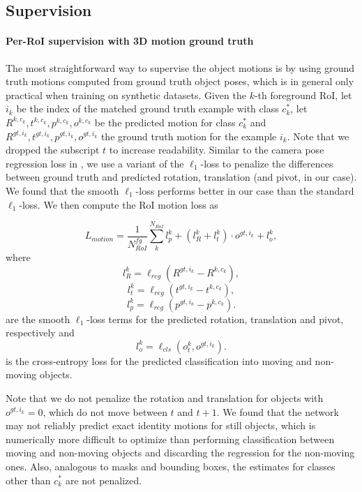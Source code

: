 \subsection{Supervision}
\label{ssec:supervision}

\paragraph{Per-RoI supervision with 3D motion ground truth}
The most straightforward way to supervise the object motions is by using ground truth
motions computed from ground truth object poses, which is in general
only practical when training on synthetic datasets.
Given the $k$-th foreground RoI, let $i_k$ be the index of the matched ground truth example with class $c_k^*$,
let $R^{k,c_k}, t^{k,c_k}, p^{k,c_k}, o^{k,c_k}$ be the predicted motion for class $c_k^*$
and $R^{gt,i_k}, t^{gt,i_k}, p^{gt,i_k}, o^{gt,i_k}$ the ground truth motion for the example $i_k$.
Note that we dropped the subscript $t$ to increase readability.
Similar to the camera pose regression loss in \cite{PoseNet2},
we use a variant of the $\ell_1$-loss to penalize the differences between ground truth and predicted
rotation, translation (and pivot, in our case). We found that the smooth $\ell_1$-loss
performs better in our case than the standard $\ell_1$-loss.
We then compute the RoI motion loss as

\begin{equation}
L_{motion} = \frac{1}{N_{RoI}^{fg}} \sum_k^{N_{RoI}} l_{p}^k + (l_{R}^k + l_{t}^k) \cdot o^{gt,i_k} + l_o^k,
\end{equation}
where
\begin{equation}
l_{R}^k = \ell_{reg} (R^{gt,i_k} - R^{k,c_k}),
\end{equation}
\begin{equation}
l_{t}^k = \ell_{reg} (t^{gt,i_k} - t^{k,c_k}),
\end{equation}
\begin{equation}
l_{p}^k = \ell_{reg} (p^{gt,i_k} - p^{k,c_k}).
\end{equation}
are the smooth $\ell_1$-loss terms for the predicted rotation, translation and pivot,
respectively and
\begin{equation}
l_o^k = \ell_{cls}(o_t^k, o^{gt,i_k}).
\end{equation}
is the cross-entropy loss for the predicted classification into moving and non-moving objects.

Note that we do not penalize the rotation and translation for objects with
$o^{gt,i_k} = 0$, which do not move between $t$ and $t+1$. We found that the network
may not reliably predict exact identity motions for still objects, which is
numerically more difficult to optimize than performing classification between
moving and non-moving objects and discarding the regression for the non-moving
ones. Also, analogous to masks and bounding boxes, the estimates for classes
other than $c_k^*$ are not penalized.

